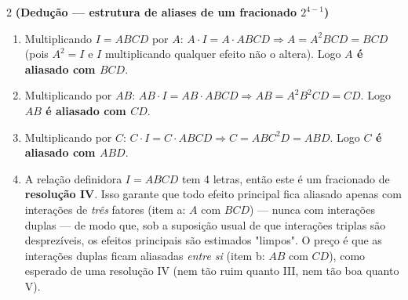 \documentclass[11pt]{article}
\begin{document}
\begin{questao}{2} \textbf{(Dedução --- estrutura de aliases de um fracionado $2^{4-1}$)}
\end{questao}
\begin{solucao}
\begin{enumerate}[label=(\alph*)]
  \item Multiplicando $I=ABCD$ por $A$: $A\cdot I = A\cdot ABCD \Rightarrow A = A^2BCD = BCD$
    (pois $A^2=I$ e $I$ multiplicando qualquer efeito não o altera). Logo \textbf{$A$ é aliasado
    com $BCD$}.
  \item Multiplicando por $AB$: $AB\cdot I = AB\cdot ABCD \Rightarrow AB = A^2B^2CD = CD$. Logo
    \textbf{$AB$ é aliasado com $CD$}.
  \item Multiplicando por $C$: $C\cdot I = C\cdot ABCD \Rightarrow C = ABC^2D = ABD$. Logo
    \textbf{$C$ é aliasado com $ABD$}.
  \item A relação definidora $I=ABCD$ tem 4 letras, então este é um fracionado de
    \textbf{resolução IV}. Isso garante que todo efeito principal fica aliasado apenas com
    interações de \emph{três} fatores (item a: $A$ com $BCD$) --- nunca com interações duplas ---
    de modo que, sob a suposição usual de que interações triplas são desprezíveis, os efeitos
    principais são estimados "limpos". O preço é que as interações duplas ficam aliasadas
    \emph{entre si} (item b: $AB$ com $CD$), como esperado de uma resolução IV (nem tão ruim
    quanto III, nem tão boa quanto V).
\end{enumerate}
\end{solucao}
\end{document}
